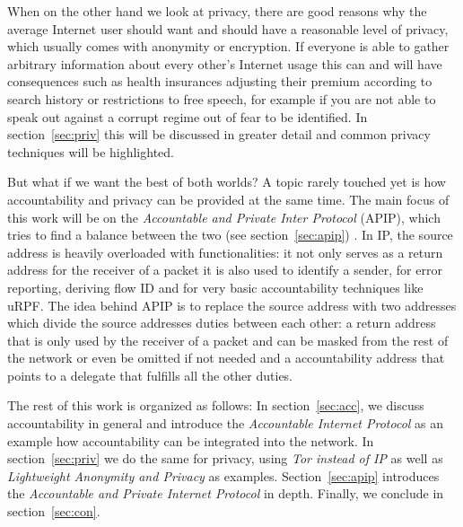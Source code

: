 \documentclass{acm_proc_article-sp}
\begin{document}
When on the other hand we look at privacy, there are good reasons why the average Internet user should want and should have a reasonable level of privacy, which usually comes with anonymity or encryption. If everyone is able to gather arbitrary information about every other's Internet usage this can and will have consequences such as health insurances adjusting their premium according to search history or restrictions to free speech, for example if you are not able to speak out against a corrupt regime out of fear to be identified. In section~\ref{sec:priv} this will be discussed in greater detail and common privacy techniques will be highlighted.

But what if we want the best of both worlds? A topic rarely touched yet is how accountability and privacy can be provided at the same time. The main focus of this work will be on the \emph{Accountable and Private Inter Protocol} (APIP), which tries to find a balance between the two (see section~\ref{sec:apip}) \cite{apip}. In IP, the source address is heavily overloaded with functionalities: it not only serves as a return address for the receiver of a packet it is also used to identify a sender, for error reporting, deriving flow ID and for very basic accountability techniques like uRPF. The idea behind APIP is to replace the source address with two addresses which divide the source addresses duties between each other: a return address that is only used by the receiver of a packet and can be masked from the rest of the network or even be omitted if not needed and a accountability address that points to a delegate that fulfills all the other duties.

The rest of this work is organized as follows: In section~\ref{sec:acc}, we discuss accountability in general and introduce the \emph{Accountable Internet Protocol} as an example how accountability can be integrated into the network. In section~\ref{sec:priv} we do the same for privacy, using \emph{Tor instead of IP} as well as \emph{Lightweight Anonymity and Privacy} as examples. Section~\ref{sec:apip} introduces the \emph{Accountable and Private Internet Protocol} in depth. Finally, we conclude in section~\ref{sec:con}.

\end{document}
